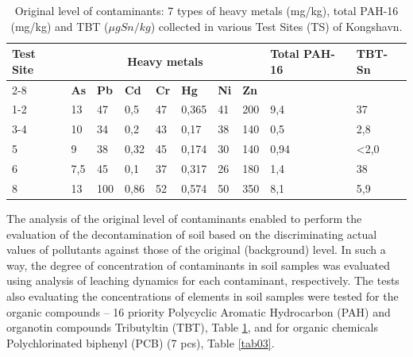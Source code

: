 \documentclass[algorithms,article,submit,pdftex,moreauthors]{Definitions/mdpi}
\begin{document}
\begin{table}[H] 
\setcellgapes{1pt}
\makegapedcells
\caption{Original level of contaminants: 7 types of heavy metals (mg/kg), total PAH-16 (mg/kg) and TBT ($\mu g Sn/kg$) collected in various Test Sites (TS) of Kongshavn.\label{tab01}}
\begin{tabularx}{\textwidth}{p{1.2cm} p{0.8cm} p{0.8cm} p{0.8cm}p{0.8cm}p{0.8cm}p{0.8cm}p{0.8cm}p{2.0cm}p{1.2cm}}
\toprule
\multirow{2}{*}{\textbf{Test Site}} & \multicolumn{7}{c}{\textbf{Heavy metals}} & \multirow{2}{*}{\textbf{Total PAH-16}} & \multirow{2}{*}{\textbf{TBT-Sn}}\\ \cline{2-8}
& \textbf{As} & \textbf{Pb} & \textbf{Cd} & \textbf{Cr} & \textbf{Hg} & \textbf{Ni} & \textbf{Zn} & & \\
\midrule
	1-2 	& 13	& 47 & 0,5 & 47 & 0,365 & 41 & 200 & 9,4 & 37 \\
	3-4 & 10	& 34 & 0,2 & 43 & 0,17 & 38 & 140 & 0,5 & 2,8 \\
	5 &    9	& 38 & 0,32 & 45 & 0,174 & 30 & 140 & 0,94 & <2,0 \\
	6 &   7,5	& 45 & 0,1 & 37 & 0,317 & 26 & 180 & 1,4 & 38 \\
	8 &   13	& 100 & 0,86 & 52 & 0,574 & 50 & 350 & 8,1 & 5,9 \\
\bottomrule
\end{tabularx}
\end{table}

The analysis of the original level of contaminants enabled to perform the evaluation of the decontamination of soil based on the discriminating actual values of pollutants against those of the original (background) level. In such a way, the degree of concentration of contaminants in soil samples was evaluated using analysis of leaching dynamics for each contaminant, respectively. The tests also evaluating the concentrations of elements in soil samples were tested for the organic compounds -- 16 priority Polycyclic Aromatic Hydrocarbon (PAH) and organotin compounds Tributyltin (TBT), Table \ref{tab01}, and for organic chemicals Polychlorinated biphenyl (PCB) (7 pcs), Table \ref{tab03}.
\end{document}
